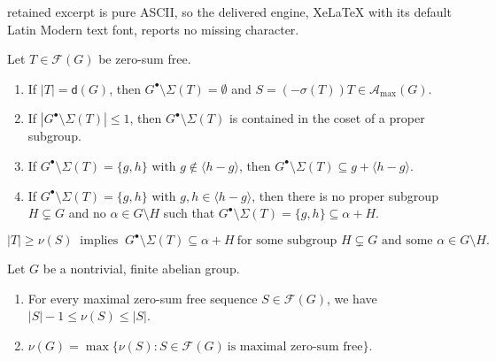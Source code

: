 \documentclass[10pt,a4paper]{amsart}
\begin{document}
retained excerpt is pure ASCII, so the delivered engine, XeLaTeX with its default Latin Modern text font, reports no missing character.
\begin{lemma}\label{2.3}
Let $T \in \mathcal F (G)$ be zero-sum free.
\begin{enumerate}
\item  If  $|T|=\mathsf d (G)$, then $G^{\bullet} \setminus \Sigma (T)= \emptyset$ and $S = (-\sigma (T))T \in \mathcal A_{\max}(G)$.

\item If $|G^{\bullet} \setminus \Sigma (T)| \le 1$, then $G^{\bullet} \setminus \Sigma (T)$ is contained in the coset of a proper subgroup.

\item If $G^{\bullet}\setminus \Sigma (T)=\{g,h\}$ with $g \notin \langle h-g \rangle$, then $G^{\bullet}\setminus \Sigma (T)\subseteq g+\langle h-g \rangle$. 

\item If  $G^{\bullet}\setminus \Sigma (T)=\{g,h\}$ with $g, h  \in \langle h-g \rangle$, then there is no proper subgroup $H \subsetneq G$ and no $\alpha\in G\setminus H$  such that $G^{\bullet}\setminus \Sigma (T)=\{g,h\}\subseteq \alpha+H $.
\end{enumerate}  
\end{lemma}

\begin{equation} \label{def-nu(S)}
|T|\geq \nu(S)  \ \mbox{ implies } \ G^{\bullet} \setminus \Sigma (T) \subseteq \alpha+H \ \mbox {for some  subgroup $H  \subsetneq  G$ and some $\alpha\in G\setminus H$}.
\end{equation}

\begin{lemma} \label{6.2}
Let $G$ be a nontrivial, finite abelian group.
\begin{enumerate}
\item For every maximal zero-sum free sequence $S \in \mathcal F (G)$, we have $|S|-1 \le \nu (S) \le |S|$.

\item $\nu (G) = \max \{ \nu (S) \colon S \in \mathcal F (G) \ \text{is maximal zero-sum free} \}$.
\end{enumerate}
\end{lemma}
\end{document}

